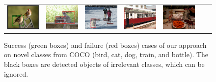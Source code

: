 {\begin{figure}[!ht]
{\begin{tabular}{ccccccc}
			\includegraphics[width=1in]{figs/coco_bird_b.pdf} & \includegraphics[width=1in]{figs/coco_cat_b.pdf} & \includegraphics[width=1in]{figs/coco_dog_b.pdf} & \includegraphics[width=1in]{figs/coco_train_b.pdf} & \includegraphics[width=1in]{figs/coco_bottle_b.pdf} \\
	\end{tabular}}
    \caption{Success (green boxes) and failure (red boxes) cases of our approach on novel classes from COCO (bird, cat, dog, train, and bottle). The black boxes are detected objects of irrelevant classes, which can be ignored. \vspace{1mm}}
    \label{fig:det-vis}
\end{figure}}

